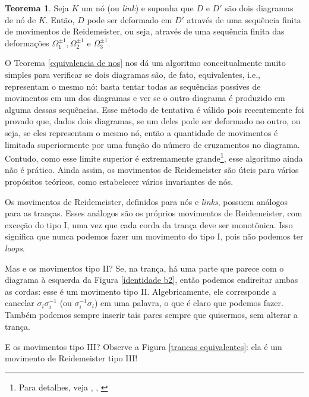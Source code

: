\documentclass[a4paper,portuguese,11pt,twoside, leqno]{book}
\theoremstyle{definition}
\newtheorem{theorem}{Teorema}[section]
\begin{document}
	\begin{theorem}
		\label{equivalencia de nos}
		Seja $K$ um nó (ou \textit{link}) e suponha que $D$ e $D'$ são dois diagramas de nó de $K$. Então, $D$ pode ser deformado em $D'$ através de uma sequência finita de movimentos de Reidemeister, ou seja, através de uma sequência finita das deformações $\Omega_1^{\pm1}, \Omega_2^{\pm1}$ e $\Omega_3^{\pm1}$. 
	\end{theorem}  
	
	\par\vspace{0.3cm} O Teorema \eqref{equivalencia de nos} nos dá um algoritmo conceitualmente muito simples para verificar se dois diagramas são, de fato, equivalentes, i.e., representam o mesmo nó: basta tentar todas as sequências possíves de movimentos em um dos diagramas e ver se o outro diagrama é produzido em alguma dessas sequências. Esse método de tentativa é válido pois recentemente foi provado que, dados dois diagramas, se um deles pode ser deformado no outro, ou seja, se eles representam o mesmo nó, então a quantidade de movimentos é limitada superiormente por uma função do número de cruzamentos no diagrama. Contudo, como esse limite superior é extremamente grande\footnote{Para detalhes, veja \cite{limite superior 1}, \cite{limite superior 2}, \cite{limite superior 3}}, esse algoritmo ainda não é prático. Ainda assim, os movimentos de Reidemeister são úteis para vários propósitos teóricos, como estabelecer vários invariantes de nós.
	\par\vspace{0.3cm} Os movimentos de Reidemeister, definidos para nós e \textit{links}, possuem análogos para as tranças. Esses análogos são os próprios movimentos de Reidemeister, com exceção do tipo I, uma vez que cada corda da trança deve ser monotônica. Isso significa que nunca podemos fazer um movimento do tipo I, pois não podemos ter \textit{loops}.  
	\par\vspace{0.3cm} Mas e os movimentos tipo II? Se, na trança, há uma parte que parece com o diagrama à esquerda da Figura \eqref{identidade b2}, então podemos endireitar ambas as cordas: esse é um movimento tipo II. Algebricamente, ele corresponde a cancelar $\sigma_i\sigma_i^{-1}$ (ou $\sigma_i^{-1}\sigma_i$) em uma palavra, o que é claro que podemos fazer. Também podemos sempre inserir tais pares sempre que quisermos, sem alterar a trança.
	\par\vspace{0.3cm} E os movimentos tipo III? Observe a Figura \eqref{trancas equivalentes}: ela é um movimento de Reidemeister tipo III!
\end{document}

